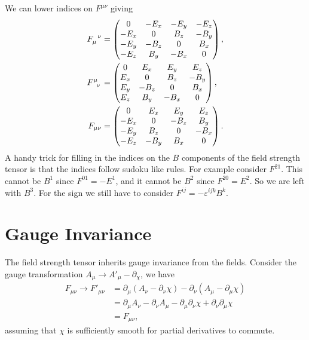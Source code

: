 We can lower indices on \(F^{\mu\nu}\) giving
\begin{align}
    \tensor{F}{_\mu^\nu} &= 
    \begin{pmatrix}
        0 & -E_x & -E_y & -E_z\\
        -E_x & 0 & B_z & -B_y\\
        -E_y & -B_z & 0 & B_x\\
        -E_z & B_y & -B_x & 0
    \end{pmatrix}
    ,\\
    \tensor{F}{^\mu_\nu} &= 
    \begin{pmatrix}
        0 & E_x & E_y & E_z\\
        E_x & 0 & B_z & -B_y\\
        E_y & -B_z & 0 & B_x\\
        E_z & B_y & -B_x & 0
    \end{pmatrix}
    ,\\
    F_{\mu\nu} &=
    \begin{pmatrix}
        0 & E_x & E_y & E_z\\
        -E_x & 0 & -B_z & B_y\\
        -E_y & B_z & 0 & -B_x\\
        -E_z & -B_y & B_x & 0
    \end{pmatrix}
    .
\end{align}
A handy trick for filling in the indices on the \(B\) components of the field strength tensor is that the indices follow sudoku like rules.
For example consider \(F^{21}\).
This cannot be \(B^1\) since \(F^{01} = -E^1\), and it cannot be \(B^2\) since \(F^{20} = E^2\).
So we are left with \(B^3\).
For the sign we still have to consider \(F^{ij} = -\varepsilon^{ijk}B^k\).

\section{Gauge Invariance}
The field strength tensor inherits gauge invariance from the fields.
Consider the gauge transformation \(A_\mu \to A'_\mu - \partial_\chi\), we have
\begin{align}
    F_{\mu\nu} \to F'_{\mu\nu} &= \partial_\mu(A_\nu - \partial_\nu\chi) - \partial_\nu(A_\mu - \partial_\mu\chi)\\
    &= \partial_\mu A_\nu - \partial_\nu A_\mu - \partial_\mu\partial_\nu\chi + \partial_\nu\partial_\mu\chi\\
    &= F_{\mu\nu},
\end{align}
assuming that \(\chi\) is sufficiently smooth for partial derivatives to commute.


